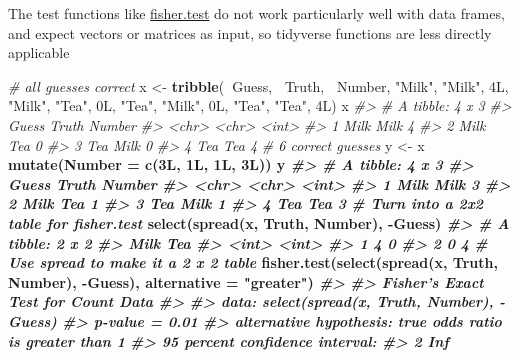 \documentclass[]{book}
\newenvironment{Shaded}{\begin{snugshade}}{\end{snugshade}}
\newcommand{\CommentTok}[1]{\textcolor[rgb]{0.56,0.35,0.01}{\textit{#1}}}
\newcommand{\DataTypeTok}[1]{\textcolor[rgb]{0.13,0.29,0.53}{#1}}
\newcommand{\KeywordTok}[1]{\textcolor[rgb]{0.13,0.29,0.53}{\textbf{#1}}}
\newcommand{\NormalTok}[1]{#1}
\newcommand{\OperatorTok}[1]{\textcolor[rgb]{0.81,0.36,0.00}{\textbf{#1}}}
\newcommand{\StringTok}[1]{\textcolor[rgb]{0.31,0.60,0.02}{#1}}
\theoremstyle{definition}
\theoremstyle{definition}
\theoremstyle{definition}
\theoremstyle{remark}
\begin{document}
The test functions like
\href{https://www.rdocumentation.org/packages/stat/topics/fisher.test}{fisher.test}
do not work particularly well with data frames, and expect vectors or
matrices as input, so tidyverse functions are less directly applicable

\begin{Shaded}
\begin{Highlighting}[]
\CommentTok{# all guesses correct}
\NormalTok{x <-}\StringTok{ }\KeywordTok{tribble}\NormalTok{(}\OperatorTok{~}\NormalTok{Guess, }\OperatorTok{~}\NormalTok{Truth, }\OperatorTok{~}\NormalTok{Number,}
             \StringTok{"Milk"}\NormalTok{, }\StringTok{"Milk"}\NormalTok{, 4L,}
             \StringTok{"Milk"}\NormalTok{, }\StringTok{"Tea"}\NormalTok{, 0L,}
             \StringTok{"Tea"}\NormalTok{, }\StringTok{"Milk"}\NormalTok{, 0L,}
             \StringTok{"Tea"}\NormalTok{, }\StringTok{"Tea"}\NormalTok{, 4L)}
\NormalTok{x}
\CommentTok{#> # A tibble: 4 x 3}
\CommentTok{#>   Guess Truth Number}
\CommentTok{#>   <chr> <chr>  <int>}
\CommentTok{#> 1 Milk  Milk       4}
\CommentTok{#> 2 Milk  Tea        0}
\CommentTok{#> 3 Tea   Milk       0}
\CommentTok{#> 4 Tea   Tea        4}
\CommentTok{# 6 correct guesses}
\NormalTok{y <-}\StringTok{ }\NormalTok{x }\OperatorTok{%>%}
\StringTok{  }\KeywordTok{mutate}\NormalTok{(}\DataTypeTok{Number =} \KeywordTok{c}\NormalTok{(3L, 1L, 1L, 3L))}
\NormalTok{y}
\CommentTok{#> # A tibble: 4 x 3}
\CommentTok{#>   Guess Truth Number}
\CommentTok{#>   <chr> <chr>  <int>}
\CommentTok{#> 1 Milk  Milk       3}
\CommentTok{#> 2 Milk  Tea        1}
\CommentTok{#> 3 Tea   Milk       1}
\CommentTok{#> 4 Tea   Tea        3}
\CommentTok{# Turn into a 2x2 table for fisher.test}
\KeywordTok{select}\NormalTok{(}\KeywordTok{spread}\NormalTok{(x, Truth, Number), }\OperatorTok{-}\NormalTok{Guess)}
\CommentTok{#> # A tibble: 2 x 2}
\CommentTok{#>    Milk   Tea}
\CommentTok{#>   <int> <int>}
\CommentTok{#> 1     4     0}
\CommentTok{#> 2     0     4}
\CommentTok{# Use spread to make it a 2 x 2 table}
\KeywordTok{fisher.test}\NormalTok{(}\KeywordTok{select}\NormalTok{(}\KeywordTok{spread}\NormalTok{(x, Truth, Number), }\OperatorTok{-}\NormalTok{Guess),}
            \DataTypeTok{alternative =} \StringTok{"greater"}\NormalTok{)}
\CommentTok{#> }
\CommentTok{#>  Fisher's Exact Test for Count Data}
\CommentTok{#> }
\CommentTok{#> data:  select(spread(x, Truth, Number), -Guess)}
\CommentTok{#> p-value = 0.01}
\CommentTok{#> alternative hypothesis: true odds ratio is greater than 1}
\CommentTok{#> 95 percent confidence interval:}
\CommentTok{#>    2 Inf}
}
\end{Highlighting}
\end{Shaded}
\end{document}
